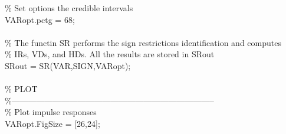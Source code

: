 \hspace{1mm}\hspace{5mm} \hspace{5mm} \textcolor{matlabgreen}{\% Set options the credible intervals }\\ 
\hspace{1mm}\hspace{5mm} \hspace{5mm} VARopt.pctg = 68; \\ 
\hspace{1mm}\hspace{5mm} \hspace{5mm}  \\ 
\hspace{1mm}\hspace{5mm} \hspace{5mm} \textcolor{matlabgreen}{\% The functin SR performs the sign restrictions identification and computes }\\ 
\hspace{1mm}\hspace{5mm} \hspace{5mm} \textcolor{matlabgreen}{\% IRs, VDs, and HDs. All the results are stored in SRout }\\ 
\hspace{1mm}\hspace{5mm} \hspace{5mm} SRout = SR(VAR,SIGN,VARopt); \\ 
\hspace{1mm}\hspace{5mm} \hspace{5mm}  \\ 
\hspace{1mm}\hspace{5mm} \hspace{5mm} \textcolor{matlabgreen}{\% PLOT }\\ 
\hspace{1mm}\hspace{5mm} \hspace{5mm} \textcolor{matlabgreen}{\%--------------------------------------------------------------------------  }\\ 
\hspace{1mm}\hspace{5mm} \hspace{5mm} \textcolor{matlabgreen}{\% Plot impulse responses }\\ 
\hspace{1mm}\hspace{5mm} \hspace{5mm} VARopt.FigSize = [26,24]; \\ 
